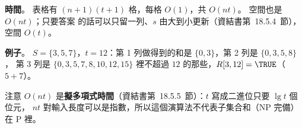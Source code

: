 \begin{pastsoln}
\textbf{時間}。 表格有 $(n + 1)(t + 1)$ 格，每格 $O(1)$，共 $O(nt)$。 空間也是 $O(nt)$；只要答案
的話可以只留一列、$s$ 由大到小更新（資結書第~18.5.4~節），空間 $O(t)$。

\textbf{例子}。 $S = \{3, 5, 7\}$，$t = 12$：第 1 列做得到的和是 $\{0, 3\}$，第 2 列是 $\{0, 3, 5, 8\}$，
第 3 列是 $\{0, 3, 5, 7, 8, 10, 12, 15\}$ 裡不超過 $12$ 的那些，$R[3, 12] = \TRUE$（$5 + 7$）。

注意 $O(nt)$ 是\textbf{擬多項式時間}（資結書第~18.5.5~節）：$t$ 寫成二進位只要 $\lg t$ 個位元，
$nt$ 對輸入長度可以是指數，所以這個演算法不代表子集合和（NP 完備）在 P 裡。
\end{pastsoln}
